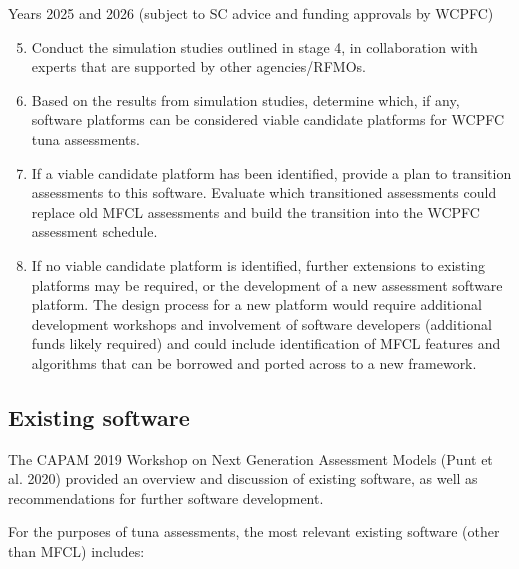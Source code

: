 \documentclass{SCreport}
\begin{document}
Years 2025 and 2026 (subject to SC advice and funding approvals by WCPFC)

\begin{enumerate}\setcounter{enumi}{4}
  \item Conduct the simulation studies outlined in stage 4, in collaboration
  with experts that are supported by other agencies/RFMOs.
  \item Based on the results from simulation studies, determine which, if any,
  software platforms can be considered viable candidate platforms for WCPFC tuna
  assessments.
  \item If a viable candidate platform has been identified, provide a plan to
  transition assessments to this software. Evaluate which transitioned
  assessments could replace old MFCL assessments and build the transition into
  the WCPFC assessment schedule.
  \item If no viable candidate platform is identified, further extensions to
  existing platforms may be required, or the development of a new assessment
  software platform. The design process for a new platform would require
  additional development workshops and involvement of software developers
  (additional funds likely required) and could include identification of MFCL
  features and algorithms that can be borrowed and ported across to a new
  framework.
\end{enumerate}

\subsection{Existing software}

The CAPAM 2019 Workshop on Next Generation Assessment Models (Punt et al. 2020)
provided an overview and discussion of existing software, as well as
recommendations for further software development.

For the purposes of tuna assessments, the most relevant existing software (other
than MFCL) includes:
\end{document}
